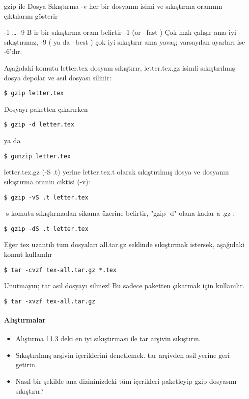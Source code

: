 \documentclass[10pt,a5paper]{book}
\begin{document}
\begin{section}{gzip ile Dosya Sıkıştırma}
-v her bir dosyanın isimi ve sıkıştırma oranının çıktılarını gösterir

-1 … -9 B ir bir sıkıştırma oranı belirtir -1 (or --fast ) Çok hızlı çalışır ama
iyi sıkıştırmaz, -9 ( ya da --best ) çok iyi sıkıştırır ama yavaş; varsayılan ayarları ise -6'dır.

Aşağıdaki komutu letter.tex dosyanı sıkıştırır, letter.tex.gz isimli sıkıştırılmış dosya depolar ve asıl dosyası silinir:
\begin{verbatim}
$ gzip letter.tex
\end{verbatim}
Dosyayı paketten çıkarırken
\begin{verbatim}
$ gzip -d letter.tex
\end{verbatim}
ya da
\begin{verbatim}
$ gunzip letter.tex
\end{verbatim}
letter.tex.gz (-S .t) yerine letter.tex.t olarak sıkıştırılmış dosya ve dosyanın sıkıştırma oranin ciktisi (-v):
\begin{verbatim}
$ gzip -vS .t letter.tex
\end{verbatim}
-s komutu sıkıştırmadan sikama üzerine belirtir, "gzip -d" olana kadar a .gz :
\begin{verbatim}
$ gzip -dS .t letter.tex
\end{verbatim}
Eğer tex uzantılı tum dosyaları all.tar.gz seklinde sıkıştırmak istersek, aşağıdaki komut kullanılır
\begin{verbatim}
$ tar -cvzf tex-all.tar.gz *.tex
\end{verbatim}
Unutmayın; tar asıl dosyayı silmez! Bu sadece paketten çıkarmak için kullanılır.
\begin{verbatim}
$ tar -xvzf tex-all.tar.gz
\end{verbatim}
\paragraph{Alıştırmalar}{
\begin{itemize}
 \item Alıştırma 11.3 deki en iyi sıkıştırması ile tar arşivin sıkıştırın.
 \item Sıkıştırılmış arşivin içeriklerini denetlemek. tar arşivden asil yerine geri getirin.
 \item Nasıl bir şekilde ana dizininizdeki tüm içerikleri paketleyip gzip dosyasını sıkıştırır?
\end{itemize}}
\end{section}
\end{document}
